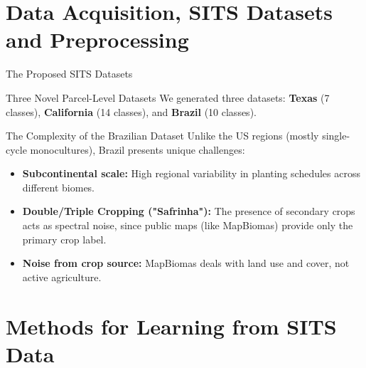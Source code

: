 \documentclass{beamer}
\begin{document}
\section{Data Acquisition, SITS Datasets and Preprocessing}

\begin{frame}{The Proposed SITS Datasets}
    \begin{block}{Three Novel Parcel-Level Datasets}
        We generated three datasets: \textbf{Texas} (7 classes), \textbf{California} (14 classes), and \textbf{Brazil} (10 classes).
    \end{block}
    \pause
    \begin{block}{The Complexity of the Brazilian Dataset}
        Unlike the US regions (mostly single-cycle monocultures), Brazil presents unique challenges:
        \begin{itemize}
            \item \textbf{Subcontinental scale:} High regional variability in planting schedules across different biomes.
            \item \textbf{Double/Triple Cropping ("Safrinha"):} The presence of secondary crops acts as spectral noise, since public maps (like MapBiomas) provide only the primary crop label.
            \item \textbf{Noise from crop source:} MapBiomas deals with land use and cover, not active agriculture. 
        \end{itemize}
    \end{block}
\end{frame}

\section{Methods for Learning from SITS Data}
\end{document}
